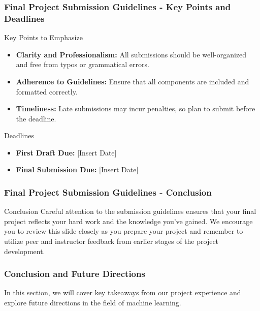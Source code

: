 \documentclass[aspectratio=169]{beamer}
\begin{document}
\begin{frame}[fragile]
    \frametitle{Final Project Submission Guidelines - Key Points and Deadlines}
    \begin{block}{Key Points to Emphasize}
        \begin{itemize}
            \item \textbf{Clarity and Professionalism:} All submissions should be well-organized and free from typos or grammatical errors.
            \item \textbf{Adherence to Guidelines:} Ensure that all components are included and formatted correctly.
            \item \textbf{Timeliness:} Late submissions may incur penalties, so plan to submit before the deadline.
        \end{itemize}
    \end{block}

    \begin{block}{Deadlines}
        \begin{itemize}
            \item \textbf{First Draft Due:} [Insert Date]
            \item \textbf{Final Submission Due:} [Insert Date]
        \end{itemize}
    \end{block}
\end{frame}

\begin{frame}[fragile]
    \frametitle{Final Project Submission Guidelines - Conclusion}
    \begin{block}{Conclusion}
        Careful attention to the submission guidelines ensures that your final project reflects your hard work and the knowledge you've gained.
        We encourage you to review this slide closely as you prepare your project and remember to utilize peer and instructor feedback from earlier stages of the project development.
    \end{block}
\end{frame}

\begin{frame}[fragile]
    \frametitle{Conclusion and Future Directions}
    In this section, we will cover key takeaways from our project experience and explore future directions in the field of machine learning.
\end{frame}
\end{document}
